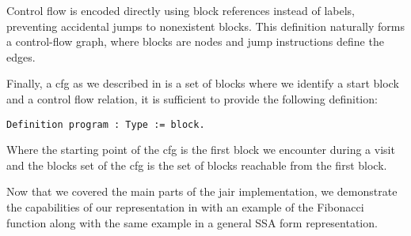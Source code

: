 Control flow is encoded directly using block references instead of labels, preventing accidental jumps to nonexistent blocks. This definition naturally forms a control-flow graph, where blocks are nodes and jump instructions define the edges.

Finally, a \gls{cfg} as we described in  is a set of blocks where we identify a start block and a control flow relation, it is sufficient to provide the following definition:

\begin{lstlisting}[style=Rocq]
Definition program : Type := block.
\end{lstlisting}

Where the starting point of the \gls{cfg} is the first block we encounter during a visit and the blocks set of the \gls{cfg} is the set of blocks reachable from the first block.

Now that we covered the main parts of the \gls{jair} implementation, we demonstrate the capabilities of our representation in  with an example of the Fibonacci function along with the same example in a general SSA form representation.

